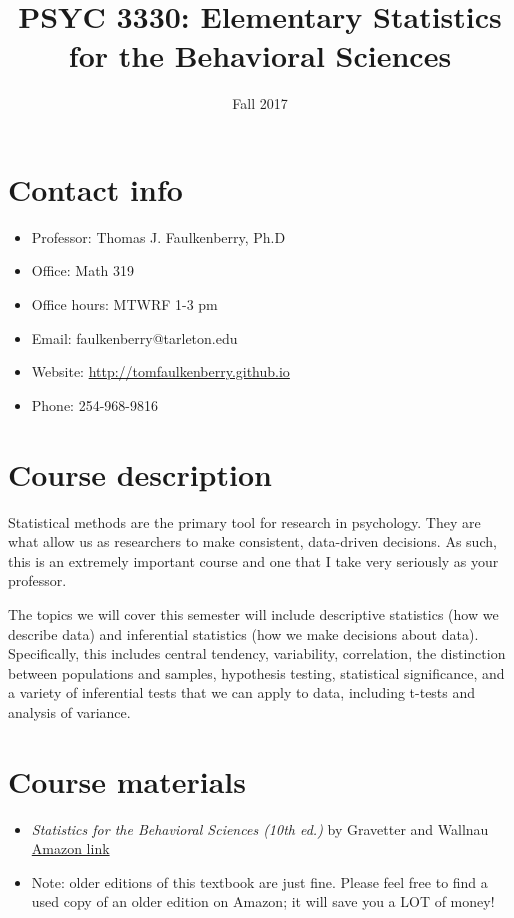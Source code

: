 \documentclass[10pt]{article}
\date{Fall 2017}
\title{PSYC 3330: Elementary Statistics for the Behavioral Sciences}
\begin{document}
\maketitle

\section*{Contact info}
\label{sec-1}
\begin{itemize}
\item Professor: Thomas J. Faulkenberry, Ph.D
\item Office: Math 319
\item Office hours: MTWRF 1-3 pm
\item Email: faulkenberry@tarleton.edu
\item Website: \url{http://tomfaulkenberry.github.io}
\item Phone: 254-968-9816
\end{itemize}

\section*{Course description}
\label{sec-2}

Statistical methods are the primary tool for research in psychology.  
They are what allow us as researchers to make consistent, data-driven 
decisions.  As such, this is an extremely important course and one that I 
take very seriously as your professor.

The topics we will cover this semester will include descriptive statistics 
(how we describe data) and inferential statistics (how we make decisions 
about data).  Specifically, this includes central tendency, variability, 
correlation, the distinction between populations and samples, hypothesis 
testing, statistical significance, and a variety of inferential tests 
that we can apply to data, including t-tests and analysis of variance.

\section*{Course materials}
\label{sec-3}
\begin{itemize}
\item \emph{Statistics for the Behavioral Sciences (10th ed.)} by Gravetter and Wallnau \href{http://www.amazon.com/Statistics-Behavioral-Sciences-MindTap-Psychology/dp/1305504917/}{Amazon link}
\item Note:  older editions of this textbook are just fine.  Please feel free to find a used copy of an older edition on Amazon; it will save you a LOT of money!
\end{itemize}
\end{document}

